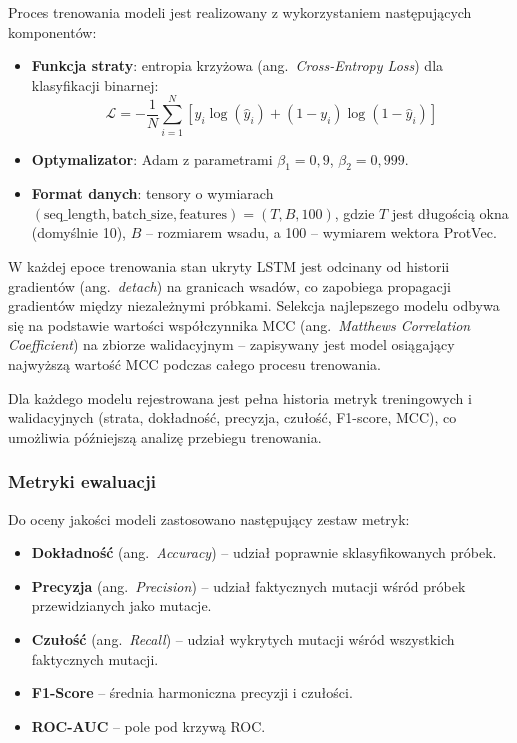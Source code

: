 Proces trenowania modeli jest realizowany z wykorzystaniem następujących komponentów:

\begin{itemize}
    \item \textbf{Funkcja straty}: entropia krzyżowa (ang.~\emph{Cross-Entropy Loss}) dla klasyfikacji binarnej:
    \begin{equation}
    \label{eq:cross-entropy}
    \mathcal{L} = -\frac{1}{N}\sum_{i=1}^{N}\left[y_i \log(\hat{y}_i) + (1 - y_i) \log(1 - \hat{y}_i)\right]
    \end{equation}

    \item \textbf{Optymalizator}: Adam z parametrami $\beta_1 = 0{,}9$, $\beta_2 = 0{,}999$.

    \item \textbf{Format danych}: tensory o wymiarach $(\text{seq\_length}, \text{batch\_size}, \text{features}) = (T, B, 100)$, gdzie $T$ jest długością okna (domyślnie 10), $B$ -- rozmiarem wsadu, a 100 -- wymiarem wektora ProtVec.
\end{itemize}

W każdej epoce trenowania stan ukryty LSTM jest odcinany od historii gradientów (ang.~\emph{detach}) na granicach wsadów, co zapobiega propagacji gradientów między niezależnymi próbkami. Selekcja najlepszego modelu odbywa się na podstawie wartości współczynnika MCC (ang.~\emph{Matthews Correlation Coefficient}) na zbiorze walidacyjnym -- zapisywany jest model osiągający najwyższą wartość MCC podczas całego procesu trenowania.

Dla każdego modelu rejestrowana jest pełna historia metryk treningowych i walidacyjnych (strata, dokładność, precyzja, czułość, F1-score, MCC), co umożliwia późniejszą analizę przebiegu trenowania.

\subsubsection{Metryki ewaluacji}
\label{subsubsec:metryki}

Do oceny jakości modeli zastosowano następujący zestaw metryk:

\begin{itemize}
    \item \textbf{Dokładność} (ang.~\emph{Accuracy}) -- udział poprawnie sklasyfikowanych próbek.
    \item \textbf{Precyzja} (ang.~\emph{Precision}) -- udział faktycznych mutacji wśród próbek przewidzianych jako mutacje.
    \item \textbf{Czułość} (ang.~\emph{Recall}) -- udział wykrytych mutacji wśród wszystkich faktycznych mutacji.
    \item \textbf{F1-Score} -- średnia harmoniczna precyzji i czułości.
    \item \textbf{ROC-AUC} -- pole pod krzywą ROC.
\end{itemize}

